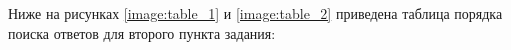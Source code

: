 Ниже на рисунках \ref{image:table_1} и \ref{image:table_2} приведена таблица порядка поиска ответов для второго пункта задания:
\begin{figure}[H]
\end{figure}

